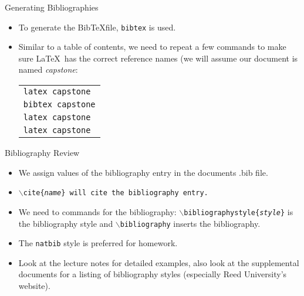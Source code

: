 \documentclass[pdf]{prosper}
\begin{document}
\begin{slide}{Generating Bibliographies}
	\begin{itemize}
		\item To generate the Bib\TeX file, \texttt{bibtex} is used.
		\item Similar to a table of contents, we need to repeat a few commands to make sure \LaTeX\ has the correct reference names (we will assume our document is named \textit{capstone}:
			\begin{center}
				\begin{tabular}{l}
					\texttt{latex capstone} \\
					\texttt{bibtex capstone} \\
					\texttt{latex capstone} \\
					\texttt{latex capstone} \\
				\end{tabular}
			\end{center}
	\end{itemize}
\end{slide}
\begin{slide}{Bibliography Review}
	\begin{itemize}
		\item We assign values of the bibliography entry in the documents .bib file.
		\item \texttt{$\backslash$cite\{\textit{name}\} will cite the bibliography entry.}
		\item We need to commands for the bibliography: \texttt{$\backslash$bibliographystyle\{\textit{style}\}} is the bibliography style and \texttt{$\backslash$bibliography} inserts the bibliography.
		\item The \texttt{natbib} style is preferred for homework.
		\item Look at the lecture notes for detailed examples, also look at the supplemental documents for a listing of bibliography styles (especially Reed University's website).
	\end{itemize}
\end{slide}
\end{document}
